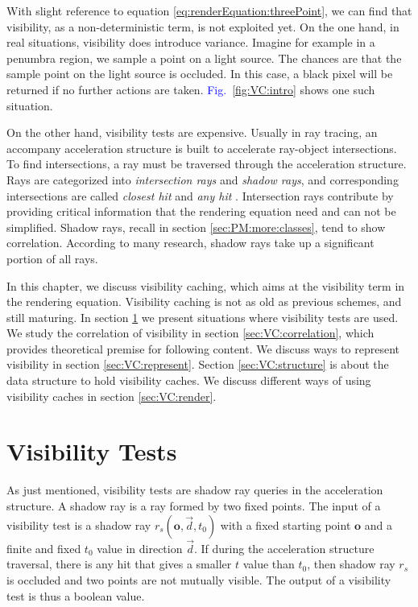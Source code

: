 \documentclass[]{book}
\renewcommand{\figurename}{\textcolor{blue}{Fig.\ }}
\begin{document}
With slight reference to equation \ref{eq:renderEquation:threePoint}, we can find that visibility, as a non-deterministic term, is not exploited yet.
On the one hand, in real situations, visibility does introduce variance.
Imagine for example in a penumbra region, we sample a point on a light source.
The chances are that the sample point on the light source is occluded.
In this case, a black pixel will be returned if no further actions are taken.
\figurename \ref{fig:VC:intro} shows one such situation.

On the other hand, visibility tests are expensive.
Usually in ray tracing, an accompany acceleration structure is built to accelerate ray-object intersections.
To find intersections, a ray must be traversed through the acceleration structure.
Rays are categorized into \textit{intersection rays} and \textit{shadow rays}, and corresponding intersections are called \textit{closest hit} and \textit{any hit} \cite{smits2005efficiency}.
Intersection rays contribute by providing critical information that the rendering equation need and can not be simplified.
Shadow rays, recall in section \ref{sec:PM:more:classes}, tend to show correlation.
According to many research, shadow rays take up a significant portion of all rays.

In this chapter, we discuss visibility caching, which aims at the visibility term in the rendering equation.
Visibility caching is not as old as previous schemes, and still maturing.
In section \ref{sec:VC:vTerm} we present situations where visibility tests are used.
We study the correlation of visibility in section \ref{sec:VC:correlation}, which provides theoretical premise for following content.
We discuss ways to represent visibility in section \ref{sec:VC:represent}.
Section \ref{sec:VC:structure} is about the data structure to hold visibility caches.
We discuss different ways of using visibility caches in section \ref{sec:VC:render}.

\section{Visibility Tests}
\label{sec:VC:vTerm}
As just mentioned, visibility tests are shadow ray queries in the acceleration structure.
A shadow ray is a ray formed by two fixed points.
The input of a visibility test is a shadow ray $r_s(\mathbf{o}, \vec{d}, t_0)$ with a fixed starting point $\mathbf{o}$ and a finite and fixed $t_0$ value in direction $\vec{d}$.
If during the acceleration structure traversal, there is any hit that gives a smaller $t$ value than $t_0$, then shadow ray $r_s$ is occluded and two points are not mutually visible.
The output of a visibility test is thus a boolean value.
\end{document}
